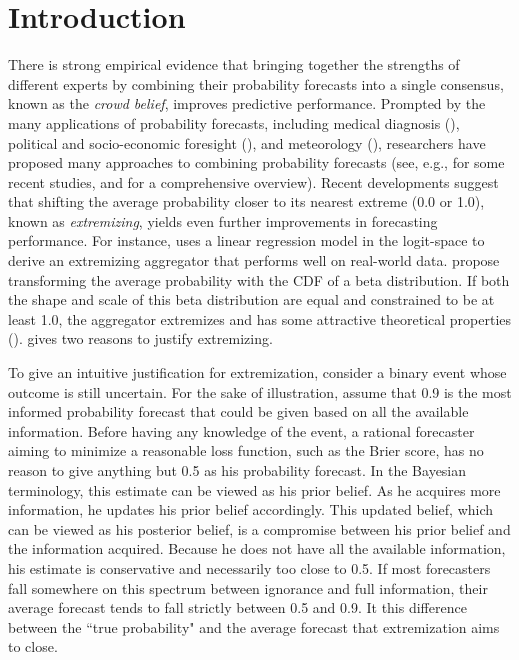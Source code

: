 \documentclass[11pt,twoside]{article}
\begin{document}
\section{Introduction}
There is strong empirical evidence that bringing together the strengths of different experts by combining their probability forecasts into a single consensus, known as the \textit{crowd belief},  improves predictive performance. Prompted by the many applications of probability forecasts, including medical diagnosis (\citet{wilson1998prediction, pepe2003statistical}), political and socio-economic foresight (\citet{tetlock2005expert}), and meteorology (\citet{sanders1963subjective, vislocky1995improved, baars2005performance}), researchers have proposed many approaches to combining probability forecasts 
(see, e.g., \citet{Ranjan08, satopaa, batchelder2010cultural} for some recent studies, and \citet{Genest, Wallsten97evaluatingand, clemen2007aggregating, primo2009calibration} for a comprehensive overview). Recent developments suggest that shifting the average probability closer to its nearest extreme (0.0 or 1.0), known as \textit{extremizing}, yields even further improvements in forecasting performance. For instance, \citet{satopaa} uses a linear regression model in the logit-space to derive an extremizing aggregator that performs well on real-world data. \citet{Ranjan08} propose transforming the average probability with the CDF of a beta distribution. If both the shape and scale of this beta distribution are equal and constrained to be at least 1.0,  the aggregator extremizes and has some attractive theoretical properties (\cite{Wallsten2001}).  \citet{Baron} gives two reasons to justify extremizing. 

To give an intuitive justification for extremization,  consider a binary event whose outcome is still uncertain.  For the sake of illustration, assume that 0.9 is the most informed probability forecast that could be given based on all the available information. Before having any knowledge of the event, a rational forecaster aiming to minimize a reasonable loss function, such as the Brier score, has no reason to give anything but 0.5 as his probability forecast. In the Bayesian terminology, this estimate can be viewed as his prior belief. As he acquires more information, he updates his prior belief accordingly.  This updated belief, which can be viewed as his posterior belief, is a compromise between his prior belief and the information acquired. Because he does not have all the available information, his estimate is conservative and necessarily too close to 0.5. If most forecasters fall somewhere on this spectrum between ignorance and full information, their average forecast tends to fall strictly between 0.5 and 0.9. It this difference between the ``true probability" and the average forecast that extremization aims to close. 
\end{document}
